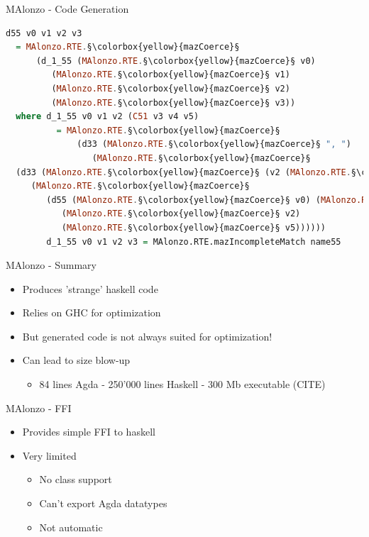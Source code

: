 \begin{frame}[fragile]{MAlonzo - Code Generation}
\begin{lstlisting}[language=Haskell,basicstyle=\scriptsize]
d55 v0 v1 v2 v3
  = MAlonzo.RTE.§\colorbox{yellow}{mazCoerce}§
      (d_1_55 (MAlonzo.RTE.§\colorbox{yellow}{mazCoerce}§ v0)
         (MAlonzo.RTE.§\colorbox{yellow}{mazCoerce}§ v1)
         (MAlonzo.RTE.§\colorbox{yellow}{mazCoerce}§ v2)
         (MAlonzo.RTE.§\colorbox{yellow}{mazCoerce}§ v3))
  where d_1_55 v0 v1 v2 (C51 v3 v4 v5)
          = MAlonzo.RTE.§\colorbox{yellow}{mazCoerce}§
              (d33 (MAlonzo.RTE.§\colorbox{yellow}{mazCoerce}§ ", ")
                 (MAlonzo.RTE.§\colorbox{yellow}{mazCoerce}§
  (d33 (MAlonzo.RTE.§\colorbox{yellow}{mazCoerce}§ (v2 (MAlonzo.RTE.§\colorbox{yellow}{mazCoerce}§ v4)))
     (MAlonzo.RTE.§\colorbox{yellow}{mazCoerce}§
        (d55 (MAlonzo.RTE.§\colorbox{yellow}{mazCoerce}§ v0) (MAlonzo.RTE.§\colorbox{yellow}{mazCoerce}§ v3)
           (MAlonzo.RTE.§\colorbox{yellow}{mazCoerce}§ v2)
           (MAlonzo.RTE.§\colorbox{yellow}{mazCoerce}§ v5))))))
        d_1_55 v0 v1 v2 v3 = MAlonzo.RTE.mazIncompleteMatch name55
\end{lstlisting}
\end{frame}

\begin{frame}{MAlonzo - Summary}
\begin{itemize}
  \item Produces 'strange' haskell code
  \item Relies on GHC for optimization
  \item But generated code is not always suited for optimization!
  \item Can lead to size blow-up
  \begin {itemize}
    \item 84 lines Agda - 250'000 lines Haskell - 300 Mb executable (CITE)
  \end{itemize}
\end{itemize}
\end{frame}


\begin{frame}{MAlonzo - FFI}
\begin{itemize}
\item Provides simple FFI to haskell
\item Very limited
  \begin{itemize}
    \item No class support
    \item Can't export Agda datatypes
    \item Not automatic
  \end{itemize}
\end{itemize}
\end{frame}

